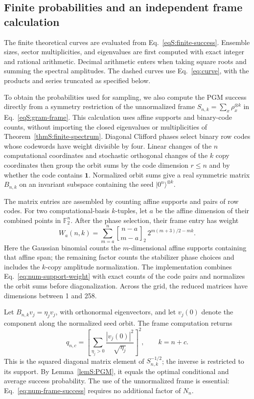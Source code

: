 \documentclass[journal,twocolumn]{IEEEtran}
\theoremstyle{definition}
\theoremstyle{plain}
\newcommand{\F}{\mathbb F}
\newcommand{\one}{\bm 1}
\newcommand{\gbinom}[3]{\genfrac{[}{]}{0pt}{}{#1}{#2}_{#3}}
\begin{document}
\subsection{Finite probabilities and an independent frame calculation}
The finite theoretical curves are evaluated from
Eq.~\eqref{eqS:finite-success}.  Ensemble sizes, sector multiplicities,
and eigenvalues are first computed with exact integer and rational
arithmetic.  Decimal arithmetic enters when taking square roots and
summing the spectral amplitudes.  The dashed curves use
Eq.~\eqref{eq:curve}, with the products and series truncated as specified
below.

To obtain the probabilities used for sampling, we also compute the PGM
success directly from a symmetry restriction of the unnormalized frame
$S_{n,k}=\sum_x\rho_x^{\otimes k}$ in
Eq.~\eqref{eqS:gram-frame}.  This calculation uses affine supports and
binary-code counts, without importing the closed eigenvalues or
multiplicities of Theorem~\ref{thmS:finite-spectrum}.
Diagonal Clifford phases select binary row codes whose codewords have
weight divisible by four.  Linear changes of the $n$ computational
coordinates and stochastic orthogonal changes of the $k$ copy
coordinates then group the orbit sums by the code dimension $r\leq n$
and by whether the code contains $\one$.
Normalized orbit sums give a real symmetric matrix $B_{n,k}$ on an
invariant subspace containing the seed $|0^n\rangle^{\otimes k}$.

The matrix entries are assembled by counting affine supports and pairs
of row codes.  For two computational-basis $k$-tuples, let $a$ be the
affine dimension of their combined points in $\F_2^n$.
After the phase selection, their frame entry has weight
\begin{equation}
 W_a(n,k)=\sum_{m=a}^{n}
 \gbinom{n-a}{m-a}{2}\,2^{m(m+3)/2-mk}.
 \label{eq:num-support-weight}
\end{equation}
Here the Gaussian binomial counts the $m$-dimensional affine supports
containing that affine span; the remaining factor counts the stabilizer
phase choices and includes the $k$-copy amplitude normalization.
The implementation combines Eq.~\eqref{eq:num-support-weight} with exact
counts of the code pairs and normalizes the orbit sums before
diagonalization.  Across the grid, the reduced matrices have dimensions
between 1 and 258.

Let $B_{n,k}v_j=\eta_jv_j$, with orthonormal eigenvectors, and let
$v_j(0)$ denote the component along the normalized seed orbit.
The frame computation returns
\begin{equation}
 q_{n,c}=\left[\sum_{\eta_j>0}
             \frac{|v_j(0)|^2}{\sqrt{\eta_j}}\right]^2,
 \qquad k=n+c.
 \label{eq:num-frame-success}
\end{equation}
This is the squared diagonal matrix element of $S_{n,k}^{-1/2}$;
the inverse is restricted to its support.  By
Lemma~\ref{lemS:PGM}, it equals the optimal conditional and average
success probability.  The use of the unnormalized frame is essential:
Eq.~\eqref{eq:num-frame-success} requires no additional factor of $N_n$.
\end{document}
